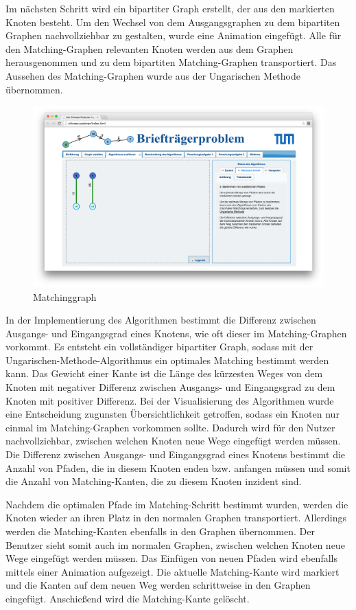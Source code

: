 Im nächsten Schritt wird ein bipartiter Graph erstellt, der aus den markierten Knoten besteht. Um den Wechsel von dem Ausgangsgraphen zu dem bipartiten Graphen nachvollziehbar zu gestalten, wurde eine Animation eingefügt. Alle für den Matching-Graphen relevanten Knoten werden aus dem Graphen herausgenommen und zu dem bipartiten Matching-Graphen transportiert. Das Aussehen des Matching-Graphen wurde aus der Ungarischen Methode übernommen. 

\begin{figure}[h!]
	\centering
	\includegraphics[width=\textwidth]{figures/postman_matching}
	\caption[Chinese-Postman: Matchinggraph]{Matchinggraph}\label{fig:postman_matching}
\end{figure}

In der Implementierung des Algorithmen bestimmt die Differenz zwischen Ausgangs- und Eingangsgrad eines Knotens, wie oft dieser im Matching-Graphen vorkommt. Es entsteht ein vollständiger bipartiter Graph, sodass mit der Ungarischen-Methode-Algorithmus ein optimales Matching bestimmt werden kann. Das Gewicht einer Kante ist die Länge des kürzesten Weges von dem Knoten mit negativer Differenz zwischen Ausgangs- und Eingangsgrad zu dem Knoten mit positiver Differenz. Bei der Visualisierung des Algorithmen wurde eine Entscheidung zugunsten Übersichtlichkeit getroffen, sodass ein Knoten nur einmal im Matching-Graphen vorkommen sollte. Dadurch wird für den Nutzer nachvollziehbar, zwischen welchen Knoten neue Wege eingefügt werden müssen. Die Differenz zwischen Ausgangs- und Eingangsgrad eines Knotens bestimmt die Anzahl von Pfaden, die in diesem Knoten enden bzw. anfangen müssen und somit die Anzahl von Matching-Kanten, die zu diesem Knoten inzident sind.

Nachdem die optimalen Pfade im Matching-Schritt bestimmt wurden, werden die Knoten wieder an ihren Platz in den normalen Graphen transportiert. Allerdings werden die Matching-Kanten ebenfalls in den Graphen übernommen. Der Benutzer sieht somit auch im normalen Graphen, zwischen welchen Knoten neue Wege eingefügt werden müssen.
Das Einfügen von neuen Pfaden wird ebenfalls mittels einer Animation aufgezeigt. Die aktuelle Matching-Kante wird markiert und die Kanten auf dem neuen Weg werden schrittweise in den Graphen eingefügt. Anschießend wird die Matching-Kante gelöscht.

